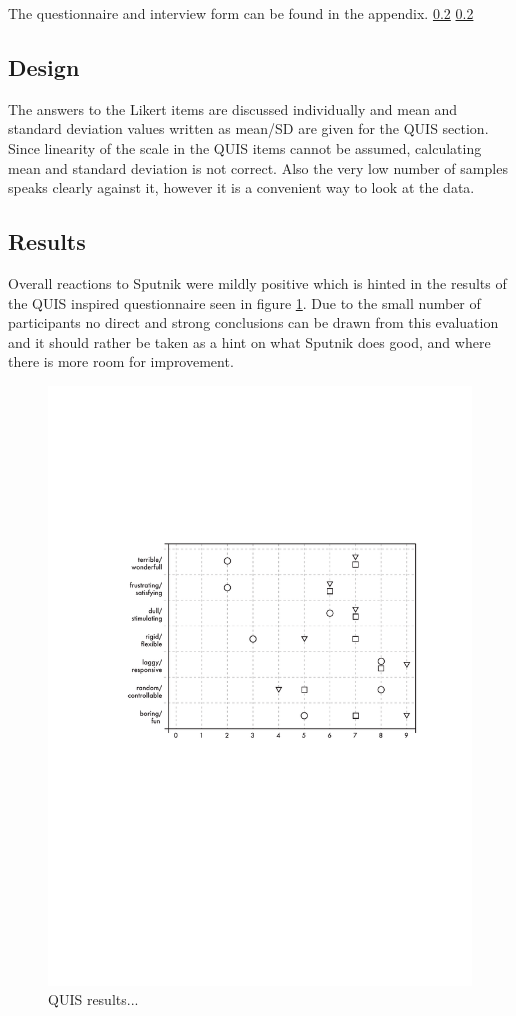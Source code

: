 \documentclass[10pt,a4paper]{scrartcl}
\begin{document}
The questionnaire and interview form can be found in the appendix. \ref{} \ref{}


\subsection{Design}
The answers to the Likert items are discussed individually and mean and standard deviation values written as mean/SD are given for the QUIS section. Since linearity of the scale in the QUIS items cannot be assumed, calculating mean and standard deviation is not correct. Also the very low number of samples speaks clearly against it, however it is a convenient way to look at the data.



\subsection{Results}
Overall reactions to Sputnik were mildly positive which is hinted in the results of the QUIS inspired questionnaire seen in figure \ref{fig:QUIS}. Due to the small number of participants no direct and strong conclusions can be drawn from this evaluation and it should rather be taken as a hint on what Sputnik does good, and where there is more room for improvement.

\begin{figure}[hbtp]
\begin{center}
\includegraphics[width = 0.8 \columnwidth]{img/stripchart}
\caption{QUIS results...}
\label{fig:QUIS}
\end{center}
\end{figure}
\end{document}
